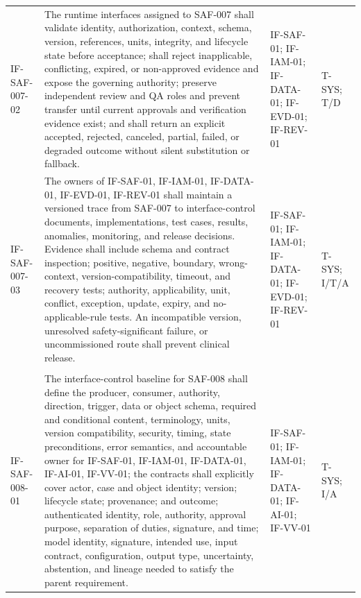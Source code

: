 \documentclass[11pt,letterpaper]{article}
\begin{document}
\begin{scriptsize}
\begin{longtable}{@{}L{0.14\textwidth}L{0.49\textwidth}L{0.19\textwidth}L{0.10\textwidth}@{}}
\addlinespace[2pt]
\mbox{IF-SAF-007-02} & The runtime interfaces assigned to SAF-007 shall validate identity, authorization, context, schema, version, references, units, integrity, and lifecycle state before acceptance; shall reject inapplicable, conflicting, expired, or non-approved evidence and expose the governing authority; preserve independent review and QA roles and prevent transfer until current approvals and verification evidence exist; and shall return an explicit accepted, rejected, canceled, partial, failed, or degraded outcome without silent substitution or fallback. & IF-SAF-01; IF-IAM-01; IF-DATA-01; IF-EVD-01; IF-REV-01 & T-SYS; T\slash\allowbreak{}D \\
\addlinespace[2pt]
\mbox{IF-SAF-007-03} & The owners of IF-SAF-01, IF-IAM-01, IF-DATA-01, IF-EVD-01, IF-REV-01 shall maintain a versioned trace from SAF-007 to interface-control documents, implementations, test cases, results, anomalies, monitoring, and release decisions. Evidence shall include schema and contract inspection; positive, negative, boundary, wrong-context, version-compatibility, timeout, and recovery tests; authority, applicability, unit, conflict, exception, update, expiry, and no-applicable-rule tests. An incompatible version, unresolved safety-significant failure, or uncommissioned route shall prevent clinical release. & IF-SAF-01; IF-IAM-01; IF-DATA-01; IF-EVD-01; IF-REV-01 & T-SYS; I\slash\allowbreak{}T\slash\allowbreak{}A \\
\addlinespace[2pt]
 \\
\addlinespace[2pt]
\mbox{IF-SAF-008-01} & The interface-control baseline for SAF-008 shall define the producer, consumer, authority, direction, trigger, data or object schema, required and conditional content, terminology, units, version compatibility, security, timing, state preconditions, error semantics, and accountable owner for IF-SAF-01, IF-IAM-01, IF-DATA-01, IF-AI-01, IF-VV-01; the contracts shall explicitly cover actor, case and object identity; version; lifecycle state; provenance; and outcome; authenticated identity, role, authority, approval purpose, separation of duties, signature, and time; model identity, signature, intended use, input contract, configuration, output type, uncertainty, abstention, and lineage needed to satisfy the parent requirement. & IF-SAF-01; IF-IAM-01; IF-DATA-01; IF-AI-01; IF-VV-01 & T-SYS; I\slash\allowbreak{}A \\

\end{longtable}
\end{scriptsize}
\end{document}

